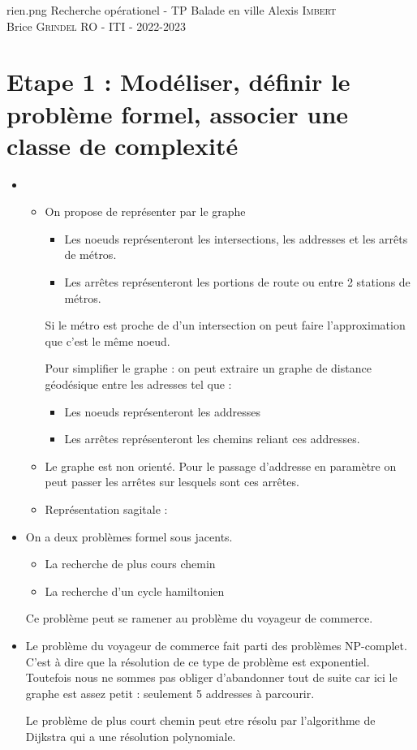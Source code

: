 \documentclass[11pt,a4paper]{article}
\begin{document}
\PageDeGarde	
{rien.png} %
{Recherche opérationel - TP} %
{Balade en ville} %
{Alexis \textsc{Imbert}\\
 Brice \textsc{Grindel}} %
{RO - ITI - 2022-2023} %



\tableofcontents
\newpage
\section{Etape 1 : Modéliser, définir le problème formel, associer une classe de complexité}
\begin{itemize}
    \item 
    \begin{itemize}
        \item On propose de représenter par le graphe 
        \begin{itemize}
            \item Les noeuds représenteront les intersections, les addresses et les arrêts de métros.
            \item Les arrêtes représenteront les portions de route ou entre 2 stations de métros.
        \end{itemize}
        Si le métro est proche de d'un intersection on peut faire l'approximation que c'est le même noeud.

        Pour simplifier le graphe : on peut extraire un graphe de distance géodésique entre les adresses tel que : 
        \begin{itemize}
            \item Les noeuds représenteront les addresses
            \item Les arrêtes représenteront les chemins reliant ces addresses.
        \end{itemize}
        \item Le graphe est non orienté. Pour le passage d'addresse en paramètre on peut passer les arrêtes sur lesquels sont ces arrêtes.
        \item Représentation sagitale :
    \end{itemize}
    \item On a deux problèmes formel sous jacents.
    \begin{itemize}
        \item La recherche de plus cours chemin
        \item La recherche d'un cycle hamiltonien
    \end{itemize}
    Ce problème peut se ramener au problème du voyageur de commerce.
    \item Le problème du voyageur de commerce fait parti des problèmes NP-complet. C'est à dire que la résolution de ce type de problème est exponentiel.
    Toutefois nous ne sommes pas obliger d'abandonner tout de suite car ici le graphe est assez petit : seulement 5 addresses à parcourir.

    Le problème de plus court chemin peut etre résolu par l'algorithme de Dijkstra qui a une résolution polynomiale.
\end{itemize}
\end{document}
